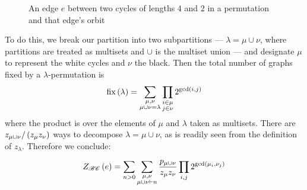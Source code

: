 \documentclass[sectionflow,singlespace,twoside]{brandiss} %
\numberwithin{section}{chapter}
\numberwithin{figure}{chapter}
\begin{document}
\begin{figure}[htb]
  \centering

  \caption[Example edge-orbit of a color-preserving isomorphism]{An edge $e$ between two cycles of lengths $4$ and $2$ in a permutation and that edge's orbit}
  \label{fig:exbcecycle}
\end{figure}

To do this, we break our partition into two subpartitions --- $\lambda = \mu \cup \nu$, where partitions are treated as multisets and $\cup$ is the multiset union --- and designate $\mu$ to represent the white cycles and $\nu$ the black.
Then the total number of graphs fixed by a $\lambda$-permutation is
\begin{equation*}
  \operatorname{fix} \left( {\lambda} \right) = \sum_{\substack{\mu, \nu \\ \mu \cup \nu = \lambda}} \prod_{\substack{i \in \mu \\ j \in \nu}} 2^{\gcd \left( {i, j} \right)}
\end{equation*}
where the product is over the elements of $\mu$ and $\lambda$ taken as multisets.
There are $z_{\mu \cup \nu} / \left( {z_{\mu} z_{\nu}} \right)$ ways to decompose $\lambda = \mu \cup \nu$, as is readily seen from the definition of $z_{\lambda}$.
Therefore we conclude:
\begin{theorem}
  \begin{equation}
    \label{eq:ecibc}
    Z_{\mathscr{BC}} \left( {e} \right) = \sum_{n > 0} \sum_{\substack{\mu, \nu \\ \mu \cup \nu \vdash n}} \frac{p_{\mu \cup \nu}}{z_{\mu} z_{\nu}} \prod_{i, j} 2^{\gcd \left( {\mu_{i}, \nu_{j}} \right)}
  \end{equation}
\end{theorem}
\end{document}
